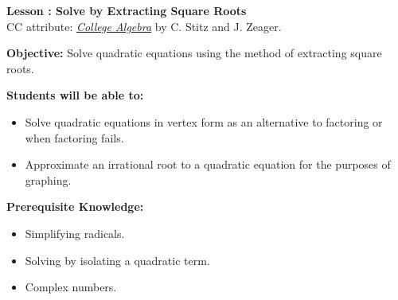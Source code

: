 \documentclass[12pt]{article}
\theoremstyle{definition}
\begin{document}
{\bf \large Lesson : Solve by Extracting Square Roots}
\\ CC attribute: \href{http://www.stitz-zeager.com}{\it{College Algebra}} by C. Stitz and J. Zeager. 
\hfill \doclicenseImage[imagewidth=5em]\\
\par
{\bf Objective:} Solve quadratic equations using the method of extracting square roots.\\
\par
{\bf Students will be able to:}
\begin{itemize}
	\item Solve quadratic equations in vertex form as an alternative to factoring or when factoring fails.
	\item Approximate an irrational root to a quadratic equation for the purposes of graphing.
\end{itemize}
{\bf Prerequisite Knowledge:}
\begin{itemize}
	\item Simplifying radicals.
	\item Solving by isolating a quadratic term.
	\item Complex numbers.
\end{itemize}
\hrulefill
\end{document}
